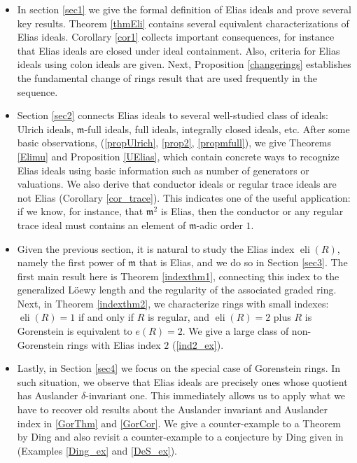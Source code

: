 \documentclass[a4paper,12pt]{amsart}
\theoremstyle{definition}
\theoremstyle{remark}
\numberwithin{equation}{section}
\DeclareMathOperator{\eli}{{eli}}
\def\fm{\mathfrak{m}}
\begin{document}
\begin{itemize}
\item In section \ref{sec1} we give the formal definition of Elias ideals and prove several key results. Theorem \ref{thmEli} contains several equivalent characterizations of Elias ideals. Corollary \ref{cor1} collects important consequences, for instance that Elias ideals are closed under ideal containment. Also, criteria for Elias ideals using colon ideals are given. Next, Proposition \ref{changerings} establishes the fundamental change of rings result that are used frequently in the sequence. 
\item Section \ref{sec2} connects Elias ideals to several well-studied class of ideals: Ulrich ideals, $\fm$-full ideals, full ideals, integrally closed ideals, etc. After some basic observations, (\ref{propUlrich}, \ref{prop2}, \ref{propmfull}), we give Theorems \ref{Elimu} and Proposition \ref{UElias}, which contain concrete ways to recognize Elias ideals using basic information such as number of generators or valuations. We also derive that conductor ideals or regular trace ideals are not Elias (Corollary \ref{cor_trace}). This indicates one of the useful application: if we know, for instance, that $\fm^2$ is Elias, then the conductor or any regular trace ideal must contains an element of $\fm$-adic order $1$. 

\item Given the previous section, it is natural to  study the Elias index $\eli(R)$, namely the first power of $\fm$ that is Elias, and we do so in Section \ref{sec3}. The first main result here is Theorem \ref{indexthm1}, connecting this index to the generalized L\"oewy length and the regularity of the associated graded ring. Next, in Theorem \ref{indexthm2}, we characterize rings with small indexes: $\eli(R)=1$ if and only if $R$ is regular, and $\eli(R)=2$ plus $R$ is Gorenstein is equivalent to $e(R)=2$. We give a large class of non-Gorenstein rings with Elias index $2$ (\ref{ind2_ex}). 

\item Lastly, in Section \ref{sec4} we focus on the special case of Gorenstein rings. In such situation, we observe that Elias ideals are precisely ones whose quotient has Auslander $\delta$-invariant one. This immediately allows us to apply what we have to recover old results about the Auslander invariant and Auslander index in  \ref{GorThm} and \ref{GorCor}. We give a counter-example to a Theorem by Ding and also revisit a counter-example to a conjecture by Ding given in \cite{DeS} (Examples \ref{Ding_ex} and \ref{DeS_ex}). 
\end{itemize}
\end{document}
